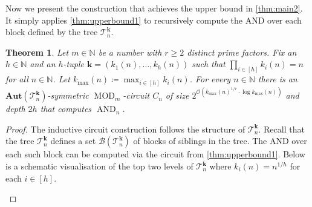 \documentclass[11pt]{article}
\DeclareMathOperator{\MOD}{MOD}
\DeclareMathOperator{\AND}{AND}
\newcommand{\Aut}{\mathbf{Aut}}
\newcommand{\bbN}{\mathbb{N}}
\newcommand{\Bb}{{\mathcal B}}
\newcommand{\Oo}{{\mathcal O}}
\newcommand{\Tt}{{\mathcal T}}
\theoremstyle{definition}
\theoremstyle{plain}
\newtheorem{theorem}[definition]{Theorem}
\theoremstyle{remark}
\theoremstyle{remark}
\begin{document}
Now we present the construction that achieves the upper bound in \cref{thm:main2}. It simply applies \cref{thm:upperbound1} to recursively compute the AND over each block defined by the tree $\Tt_n^{\boldsymbol{k}}$. 
\begin{theorem}
	\label{thm:upperbound2}
	Let $m \in \bbN$ be a number with $r \geq 2$ distinct prime factors.
	Fix an $h \in \bbN$ and an $h$-tuple $\boldsymbol{k} = (k_1(n), \dots, k_h(n))$ such that $\prod_{i \in [h]} k_i(n) = n$ for all $n \in \bbN$. 
	Let $k_{\text{max}}(n) \coloneqq \max_{i \in [h]} k_i(n)$.
	For every $n \in \bbN$ there is an $\Aut(\Tt_n^{\boldsymbol{k}})$-symmetric $\MOD_m$-circuit $C_n$ of size $2^{\Oo(k_{\text{max}}(n)^{1/r} \cdot \log k_{\text{max}}(n))}$ and depth $2h$ that computes $\AND_n$.
\end{theorem}
\begin{proof}
	The inductive circuit construction follows the structure of $\Tt_n^{\boldsymbol{k}}$. Recall that the tree $\Tt_n^{\boldsymbol{k}}$ defines a set $\Bb(\Tt_n^{\boldsymbol{k}})$ of blocks of siblings in the tree. The AND over each such block can be computed via the circuit from \cref{thm:upperbound1}. 
	Below is a schematic visualisation of the top two levels of $\Tt_n^{\boldsymbol{k}}$ where $k_i(n) = n^{1/h}$ for each $i \in [h]$.
	\begin{figure}[h]
		\begin{center}
\end{center}
\end{figure}
\end{proof}
\end{document}
